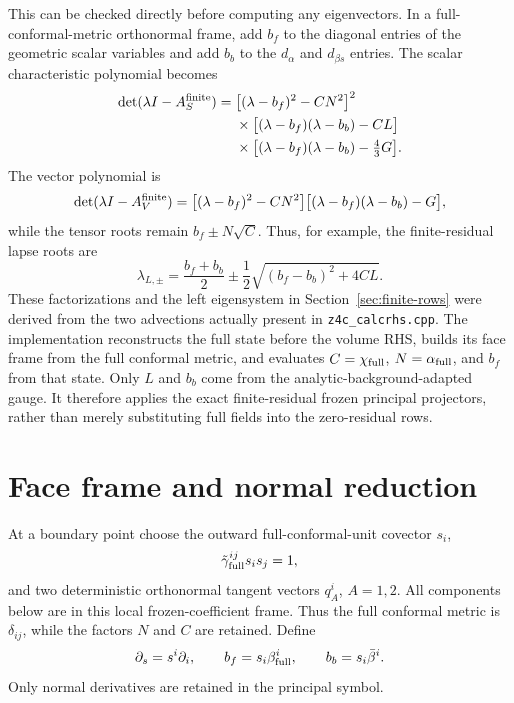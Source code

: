 \documentclass[11pt]{article}
\begin{document}
This can be checked directly before computing any eigenvectors.  In a
full-conformal-metric orthonormal frame, add \(b_f\) to the diagonal entries of the
geometric scalar variables and add \(b_b\) to the \(d_\alpha\) and
\(d_{\beta s}\) entries.  The scalar characteristic polynomial becomes
\begin{align}
 \det(\lambda I-A_S^{\rm finite})
={}&\big[(\lambda-b_f)^2-CN^2\big]^2\\
 &\times\big[(\lambda-b_f)(\lambda-b_b)-CL\big]\\
 &\times\big[(\lambda-b_f)(\lambda-b_b)-\tfrac43G\big].
 \label{eq:finite-scalar-polynomial}
\end{align}
The vector polynomial is
\[
 \det(\lambda I-A_V^{\rm finite})
 =\big[(\lambda-b_f)^2-CN^2\big]
  \big[(\lambda-b_f)(\lambda-b_b)-G\big],
 \label{eq:finite-vector-polynomial}
\]
while the tensor roots remain \(b_f\pm N\sqrt C\).  Thus, for example, the
finite-residual lapse roots are
\[
 \lambda_{L,\pm}=\frac{b_f+b_b}{2}
  \mathbin{\pm}\frac12\sqrt{(b_f-b_b)^2+4CL}.
\]
These factorizations and the left eigensystem in
Section~\ref{sec:finite-rows} were derived from the two advections actually
present in \texttt{z4c\_calcrhs.cpp}.  The implementation reconstructs the
full state before the volume RHS, builds its face frame from the full
conformal metric, and evaluates \(C=\chi_{\rm full}\),
\(N=\alpha_{\rm full}\), and \(b_f\) from that state.  Only \(L\) and \(b_b\)
come from the analytic-background-adapted gauge.  It therefore applies the
exact finite-residual frozen principal projectors, rather than merely
substituting full fields into the zero-residual rows.

\section{Face frame and normal reduction}

At a boundary point choose the outward full-conformal-unit covector \(s_i\),
\[
 \tilde\gamma_{\rm full}^{ij}s_i s_j=1,
\]
and two deterministic orthonormal tangent vectors \(q_A^i\), \(A=1,2\).
All components below are in this local frozen-coefficient frame.  Thus the
full conformal metric is \(\delta_{ij}\), while the factors \(N\) and \(C\)
are retained.  Define
\[
 \partial_s=s^i\partial_i,\qquad
 b_f=s_i\beta_{\rm full}^i,\qquad b_b=s_i\bar\beta^i.
\]
Only normal derivatives are retained in the principal symbol.
\end{document}
